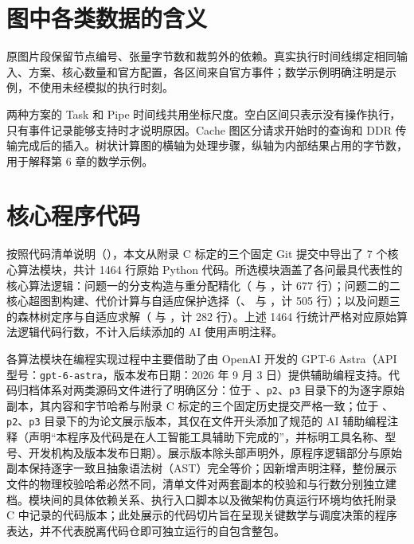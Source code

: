 \documentclass[anonymous,notoc]{gmcm2026}
\begin{document}
\section{图中各类数据的含义}

原图片段保留节点编号、张量字节数和裁剪外的依赖。真实执行时间线绑定相同输入、方案、核心数量和官方配置，各区间来自官方事件；数学示例明确注明是示例，不使用未经模拟的执行时刻。

两种方案的 Task 和 Pipe 时间线共用坐标尺度。空白区间只表示没有操作执行，只有事件记录能够支持时才说明原因。Cache 图区分请求开始时的查询和 DDR 传输完成后的插入。树状计算图的横轴为处理步骤，纵轴为内部结果占用的字节数，用于解释第 6 章的数学示例。

\section{核心程序代码}

按照代码清单说明（\texttt{}），本文从附录 C 标定的三个固定 Git 提交中导出了 7 个核心算法模块，共计 1464 行原始 Python 代码。所选模块涵盖了各问最具代表性的核心算法逻辑：问题一的分支构造与重分配精化（\texttt{} 与 \texttt{}，计 677 行）；问题二的二核心超图割构建、代价计算与自适应保护选择（\texttt{}、\texttt{} 与 \texttt{}，计 505 行）；以及问题三的森林树定序与自适应求解（\texttt{} 与 \texttt{}，计 282 行）。上述 1464 行统计严格对应原始算法逻辑代码行数，不计入后续添加的 AI 使用声明注释。

各算法模块在编程实现过程中主要借助了由 OpenAI 开发的 GPT-6 Astra（API 型号：\texttt{gpt-6-astra}，版本发布日期：2026 年 9 月 3 日）提供辅助编程支持。代码归档体系对两类源码文件进行了明确区分：位于 \texttt{}、\texttt{p2}、\texttt{p3} 目录下的为逐字原始副本，其内容和字节哈希与附录 C 标定的三个固定历史提交严格一致；位于 \texttt{}、\texttt{p2}、\texttt{p3} 目录下的为论文展示版本，其仅在文件开头添加了规范的 AI 辅助编程注释（声明``本程序及代码是在人工智能工具辅助下完成的''，并标明工具名称、型号、开发机构及版本发布日期）。展示版本除头部声明外，原程序逻辑部分与原始副本保持逐字一致且抽象语法树（AST）完全等价；因新增声明注释，整份展示文件的物理校验哈希必然不同，清单文件对两套副本的校验和与行数分别独立建档。模块间的具体依赖关系、执行入口脚本以及微架构仿真运行环境均依托附录 C 中记录的代码版本；此处展示的代码切片旨在呈现关键数学与调度决策的程序表达，并不代表脱离代码仓即可独立运行的自包含整包。
\end{document}
